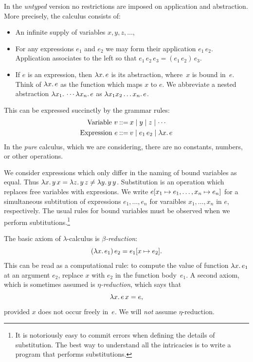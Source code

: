 In the \emph{untyped} version no restrictions are imposed on
application and abstraction. More precisely, the calculus consists of:
%
\begin{itemize}
\item An infinite supply of variables $x, y, z, \ldots$,
\item For any expressions $e_1$ and $e_2$ we may form their
  application $e_1\, e_2$. Application associates to the left so that
  $e_1\, e_2\, e_3 = (e_1\, e_2)\, e_3$.
\item If $e$ is an expression, then $\lambda x .\,e$ is its abstraction,
  where~$x$ is bound in~$e$. Think of $\lambda x .\,e$ as the function
  which maps $x$ to $e$. We abbreviate a nested abstraction
  $\lambda x_1 .\,\cdots \lambda x_n .\,e$ as $\lambda x_1 x_2 \ldots x_n .\,e$.
\end{itemize}
%
This can be expressed succinctly by the grammar rules:
%
\begin{align*}
  \text{Variable}\ v &\mathbin{{:}{:}{=}} x \mid y \mid z \mid \cdots \\
  \text{Expression}\ e &\mathbin{{:}{:}{=}} v \mid e_1\,e_2 \mid \lambda x .\,e
\end{align*}
%
In the \emph{pure} calculus, which we are considering, there are no
constants, numbers, or other operations.

We consider expressions which only differ in the naming of bound
variables as equal. Thus $\lambda x .\,y\, x = \lambda z .\,y\, z \neq
\lambda y .\,y\, y$. Substitution is an operation which replaces free
variables with expresions. We write $e[x_1 \mapsto e_1,
  \ldots, x_n \mapsto e_n]$ for a simultaneous subtitution of
expressions $e_1, \ldots, e_n$ for varaibles $x_1, \ldots, x_n$ in
$e$, respectively. The usual rules for bound variables must be
observed when we perform subtitutions.\footnote{It is notoriously easy
  to commit errors when defining the details of substitution. The best
  way to understand all the intricacies is to write a program that
  performs substitutions.}

The basic axiom of $\lambda$-calculus is \emph{$\beta$-reduction}:
%
\begin{equation*}
  (\lambda x .\,e_1)\, e_2 = e_1[x \mapsto e_2].
\end{equation*}
%
This can be read as a computational rule: to compute the value of
function $\lambda x .\,e_1$ at an argument $e_2$, replace $x$ with $e_2$
in the function body~$e_1$. A second axiom, which is sometimes assumed
is \emph{$\eta$-reduction}, which says that
%
\begin{equation*}
  \lambda x .\,e\, x = e,
\end{equation*}
%
provided $x$ does not occur freely in~$e$. We will \emph{not} assume
$\eta$-reduction.

